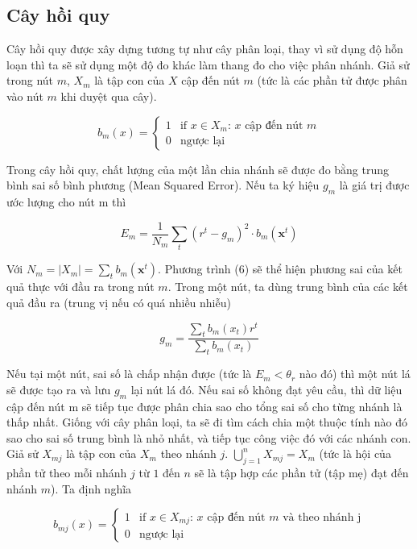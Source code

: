\subsection{Cây hồi quy}
Cây hồi quy được xây dựng tương tự như cây phân loại, thay vì sử dụng độ hỗn loạn thì ta sẽ sử dụng một độ đo khác làm thang đo cho việc phân nhánh.
Giả sử trong nút $m$, $X_m$ là tập con của $X$ cập đến nút $m$ (tức là các phần tử được phân vào nút $m$ khi duyệt qua cây).

\begin{equation} b_m(x) = \begin{cases} 1 & \text{if } x \in X_m: \, x \text{ cập đến nút  } m\\ 0 & \text{ngược lại} \end{cases} \end{equation}

Trong cây hồi quy, chất lượng của một lần chia nhánh sẽ được đo bằng trung bình sai số bình phương (Mean Squared Error). Nếu ta ký hiệu $g_m$ là giá trị được ước lượng cho nút m thì

\begin{equation} E_m = \frac{1}{N_m} \sum_t{(r^t - g_m)^2 \cdot b_m(\mathbf{x}^t)} \end{equation}

Với $N_m = |{X_m}| = \sum_t{b_m(\mathbf{x}^t)}$.
Phương trình (6) sẽ thể hiện phương sai của kết quả thực với đầu ra trong nút $m$.
Trong một nút, ta dùng trung bình của các kết quả đầu ra (trung vị nếu có quá nhiều nhiễu)

\begin{equation} g_m = \frac{\sum_t {b_m (x_t)r^t}}{\sum_t {b_m (x_t)}} \end{equation}

Nếu tại một nút, sai số là chấp nhận được (tức là $E_m < \theta_r$ nào đó) thì một nút lá sẽ được tạo ra và lưu $g_m$ lại nút lá đó.
Nếu sai số không đạt yêu cầu, thì dữ liệu cập đến nút m sẽ tiếp tục được phân chia sao cho tổng sai số cho từng nhánh là thấp nhất. Giống với cây phân loại, ta sẽ đi tìm cách chia một thuộc tính nào đó sao cho sai số trung bình là nhỏ nhất, và tiếp tục công việc đó với các nhánh con.
Giả sử $X_{mj}$ là tập con của $X_m$ theo nhánh $j$. $\bigcup_{j=1}^{n} X_{mj} = X_{m}$ (tức là hội của phần tử theo mỗi nhánh $j$ từ $1$ đến $n$ sẽ là tập hợp các phần tử (tập mẹ) đạt đến nhánh $m$).
Ta định nghĩa

\begin{equation} b_{mj}(x) = \begin{cases} 1 & \text{if } x \in X_{mj}: \, x \text{ cập đến nút  } m \text {  và theo nhánh j}\\ 0  & \text{ngược lại} \end{cases} \end{equation}

